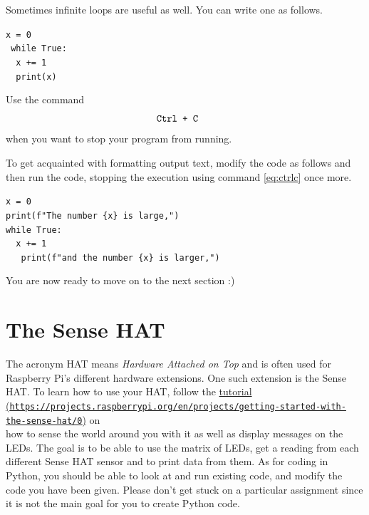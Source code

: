 \documentclass{article}
\begin{document}
\noindent Sometimes infinite loops are useful as well.
You can write one as follows.
\begin{center}
    \verb!x = 0      !\\
    \verb! while True:!\\
    \verb!  x += 1   !\\
    \verb!  print(x) !
\end{center}
Use the command
\begin{equation}
\label{eq:ctrlc}
\verb!Ctrl + C   !
\end{equation}
when you want to stop your program from running.

\newpage
\noindent To get acquainted with formatting output text, modify the code as follows and then run the code, stopping the execution using command \eqref{eq:ctrlc} once more.
\begin{center}
    \verb!x = 0                                    !\\
    \verb!print(f"The number {x} is large,")       !\\
    \verb!while True:                              !\\
    \verb!  x += 1                                 !\\
    \verb!   print(f"and the number {x} is larger,")!\\
\end{center}
You are now ready to move on to the next section :)

\section{The Sense HAT}
The acronym HAT means \emph{Hardware Attached on Top} and is often used for Raspberry Pi's different hardware extensions. One such extension is the Sense HAT. To learn how to use your HAT, follow the {\color{blue}\href{https://projects.raspberrypi.org/en/projects/getting-started-with-the-sense-hat/0}{tutorial (\texttt{https://projects.raspberrypi.org/en/projects/getting-started-with-the-sense-hat/0})}} on\\ how to sense the world around you with it as well as display messages on the LEDs. The goal is to be able to use the matrix of LEDs, get a reading from each different Sense HAT sensor and to print data from them. As for coding in Python, you should be able to look at and run existing code, and modify the code you have been given. Please don't get stuck on a particular assignment since it is not the main goal for you to create Python code.\\
\end{document}

